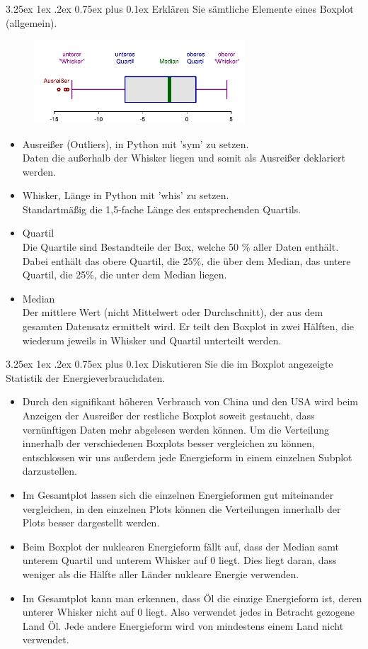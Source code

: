 \documentclass[12pt,a4paper]{scrartcl}
\makeatletter
\renewcommand\subparagraph{\@startsection{subparagraph}{5}{\parindent}%
    {3.25ex \@plus1ex \@minus .2ex}%
    {0.75ex plus 0.1ex}%
    {\normalfont\normalsize\bfseries}}
\makeatother
\begin{document}
\subparagraph{Erkl\"aren Sie s\"amtliche Elemente eines Boxplot (allgemein). }
\begin{figure}[!h]
\centering
\includegraphics[width=0.7\textwidth]{Plots/Elements_of_a_boxplot.pdf}
\end{figure}
\begin{itemize}
\item Ausrei\ss er (\grqq Outliers\grqq ), in Python mit 'sym' zu setzen. \\
Daten die au\ss erhalb der Whisker liegen und somit als Ausrei\ss er deklariert werden.
\item Whisker, L\"ange in Python mit 'whis' zu setzen.\\
Standartm\"a\ss ig die 1,5-fache L\"ange des entsprechenden Quartils. 
\item Quartil\\
Die Quartile sind Bestandteile der Box, welche 50 \% aller Daten enth\"alt. Dabei enth\"alt das obere Quartil, die 25\%, die \"uber dem Median, das untere Quartil, die 25\%, die unter dem Median liegen.
\item Median\\
Der mittlere Wert (nicht Mittelwert oder Durchschnitt), der aus dem gesamten Datensatz ermittelt wird. Er teilt den Boxplot in zwei H\"alften, die wiederum jeweils in Whisker und Quartil unterteilt werden.
\end{itemize}

\subparagraph{Diskutieren Sie die im Boxplot angezeigte Statistik der Energieverbrauchdaten.}
\begin{itemize}
\item Durch den signifikant h\"oheren Verbrauch von China und den USA wird beim Anzeigen der Ausrei\ss er der restliche Boxplot soweit gestaucht, dass vern\"unftigen Daten mehr abgelesen werden k\"onnen. 
Um die Verteilung innerhalb der verschiedenen Boxplots besser vergleichen zu k\"onnen, entschlossen wir uns au\ss erdem jede Energieform in einem einzelnen Subplot darzustellen. 
\item Im Gesamtplot lassen sich die einzelnen Energieformen gut miteinander vergleichen, in den einzelnen Plots k\"onnen die Verteilungen innerhalb der Plots besser dargestellt werden.  
\item Beim Boxplot der nuklearen Energieform f\"allt auf, dass der Median samt unterem Quartil und unterem Whisker auf 0 liegt. Dies liegt daran, dass weniger als die H\"alfte aller L\"ander nukleare Energie verwenden. 
\item Im Gesamtplot kann man erkennen, dass \"Ol die einzige Energieform ist, deren unterer Whisker nicht auf 0 liegt. Also verwendet jedes in Betracht gezogene Land \"Ol. Jede andere Energieform wird von mindestens einem Land nicht verwendet. 
\end{itemize}
\end{document}
